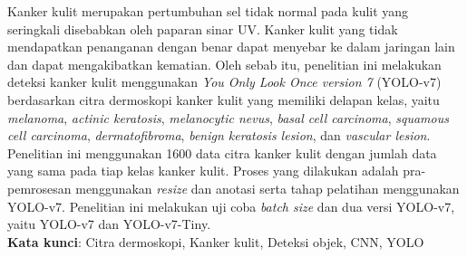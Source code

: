 \documentclass[]{mathuinsa}
\begin{document}
    \newpage{}
    \begin{onehalfspacing}\listoftables\end{onehalfspacing}


    \newpage{}
    \begin{onehalfspacing}\listoffigures\end{onehalfspacing}


    \begin{abstractind}
        Kanker kulit merupakan pertumbuhan sel tidak normal pada kulit yang seringkali disebabkan oleh paparan sinar UV. Kanker kulit yang tidak mendapatkan penanganan dengan benar dapat menyebar ke dalam jaringan lain dan dapat mengakibatkan kematian. Oleh sebab itu, penelitian ini melakukan deteksi kanker kulit menggunakan \textit{You Only Look Once version 7} (YOLO-v7) berdasarkan citra dermoskopi kanker kulit yang memiliki delapan kelas, yaitu \textit{melanoma}, \textit{actinic keratosis}, \textit{melanocytic nevus}, \textit{basal cell carcinoma}, \textit{squamous cell carcinoma}, \textit{dermatofibroma}, \textit{benign keratosis lesion}, dan \textit{vascular lesion}. Penelitian ini menggunakan 1600 data citra kanker kulit dengan jumlah data yang sama pada tiap kelas kanker kulit. Proses yang dilakukan adalah pra-pemrosesan menggunakan \textit{resize} dan anotasi serta tahap pelatihan menggunakan YOLO-v7. Penelitian ini melakukan uji coba \textit{batch size} dan dua versi YOLO-v7, yaitu YOLO-v7 dan YOLO-v7-Tiny.\\
        \noindent
        \textbf{Kata kunci}: Citra dermoskopi, Kanker kulit, Deteksi objek, CNN, YOLO
    \end{abstractind}
    
\end{document}

